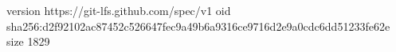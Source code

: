 version https://git-lfs.github.com/spec/v1
oid sha256:d2f92102ac87452c526647fec9a49b6a9316ce9716d2e9a0cdc6dd51233fe62e
size 1829
